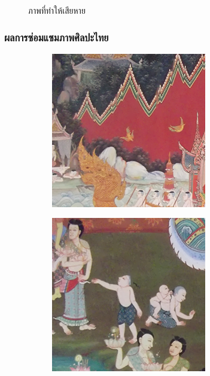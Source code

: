 \documentclass[xcolor=dvipsnames, xetex,serif]{beamer}
\numberwithin{equation}{section}
\begin{document}
\begin{frame}
\begin{figure}[H]
\begin{subfigure}{0.3\linewidth}
            \end{subfigure}
            \caption{ภาพที่ทำให้เสียหาย}
        \end{figure}
    \end{frame}
    \begin{frame}
        \frametitle{ผลการซ่อมแซมภาพศิลปะไทย}
        \begin{figure}[H]
            \centering
            \begin{subfigure}{0.15\linewidth}
                \centering
                \includegraphics[width=0.9\linewidth]{images/result_ex4/splitbergman_case01.png}
            \end{subfigure}
            \begin{subfigure}{0.15\linewidth}
                \centering
                \includegraphics[width=0.9\linewidth]{images/result_ex4/splitbergman_case02.png}

\end{subfigure}
\end{figure}
\end{frame}
\end{document}
